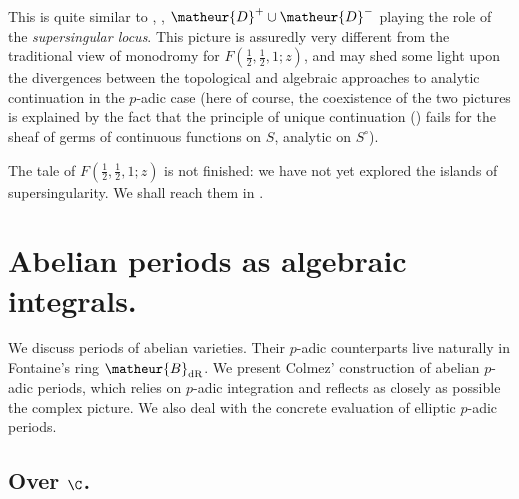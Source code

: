 This is quite similar to ,
, $\matheur{D}^+\cup \matheur{D}^-$ playing
the role of the \emph{supersingular locus}. This picture is assuredly
very different from the traditional view of monodromy for
$F(\frac{1}{2},\frac{1}{2},1;z)$, and may shed some light upon the
divergences between the topological and algebraic approaches to analytic
continuation in the $p$-adic case (here of course, the coexistence of
the two pictures is explained by the fact that the principle of unique
continuation () fails for the sheaf
of germs of continuous functions on $S$, analytic on $S^{\circ}$).

The tale of $F(\frac{1}{2},\frac{1}{2},1;z)$ is not finished: we have
not yet explored the islands of supersingularity. We shall reach them in
.

\newpage
\section{Abelian periods as algebraic integrals.}

\begin{abst}
 We discuss periods of abelian varieties. Their $p$-adic counterparts 
 live naturally in Fontaine's ring $\matheur{B}_{\mathrm{dR}}$. We present 
 Colmez' construction of abelian $p$-adic periods, which relies on 
 $p$-adic integration and reflects as closely as possible the complex
 picture.
 We also deal with the concrete evaluation of elliptic $p$-adic periods.
\end{abst}

\subsection{Over $\C$.}\label{sub-complex-integ}

